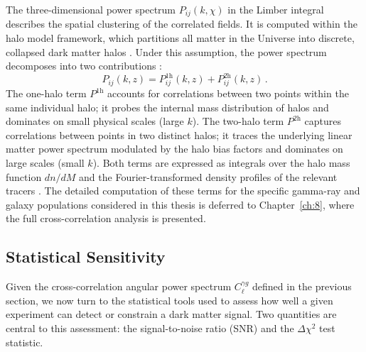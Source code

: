 The three-dimensional power spectrum $P_{ij}(k,\chi)$ in the Limber integral describes the spatial clustering of the correlated fields.
It is computed within the halo model framework, which partitions all matter in the Universe into discrete, collapsed dark matter halos \cite{Cooray:2002dia}.
Under this assumption, the power spectrum decomposes into two contributions \cite{Cooray:2002dia,Fornengo:2013rga}:
\begin{equation}
	P_{ij}(k, z) = P_{ij}^{\mathrm{1h}}(k, z) + P_{ij}^{\mathrm{2h}}(k, z)\,.
	\label{eq:halo_model_decomposition}
\end{equation}
The one-halo term $P^{\mathrm{1h}}$ accounts for correlations between two points within the same individual halo; it probes the internal mass distribution of halos and dominates on small physical scales (large $k$).
The two-halo term $P^{\mathrm{2h}}$ captures correlations between points in two distinct halos; it traces the underlying linear matter power spectrum modulated by the halo bias factors and dominates on large scales (small $k$).
Both terms are expressed as integrals over the halo mass function $dn/dM$ and the Fourier-transformed density profiles of the relevant tracers \cite{Cooray:2002dia,Fornengo:2013rga}.
The detailed computation of these terms for the specific gamma-ray and galaxy populations considered in this thesis is deferred to Chapter~\ref{ch:8}, where the full cross-correlation analysis is presented.

\subsection{Statistical Sensitivity}
\label{sec:statistical_sensitivity}

Given the cross-correlation angular power spectrum $C_\ell^{\gamma g}$ defined in the previous section, we now turn to the statistical tools used to assess how well a given experiment can detect or constrain a dark matter signal.
Two quantities are central to this assessment: the signal-to-noise ratio (SNR) and the $\Delta\chi^2$ test statistic.

